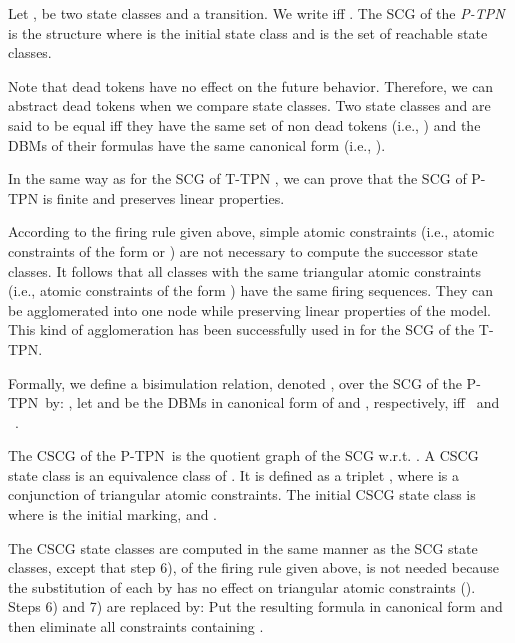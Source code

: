 \documentclass[submission,copyright,creativecommons]{eptcs}
\numberwithin{equation}{section}
\def\tppn{P-TPN}
\def\ttpn{T-TPN}
\begin{document}
\par Let ,  be two state classes and  a
transition. We write 
iff . The SCG of the
\emph{P-TPN} is the structure  where  is the initial state class and
 is the set of reachable state classes. \par Note that dead tokens have no effect on the future behavior. Therefore, we can abstract dead tokens when we compare state classes. Two state classes  and  are said to be equal iff they have the same set of non dead tokens (i.e., ) and the DBMs of their formulas have the same canonical form (i.e., ).
\par In the same way as for the SCG of T-TPN \cite{BVer03}, we can prove that the SCG of P-TPN is finite and  preserves linear properties.
\par According to the firing rule given above, simple atomic constraints (i.e., atomic constraints of the form  or ) are not necessary to compute the successor state classes. It follows that all classes with the same triangular atomic constraints (i.e., atomic constraints of the form ) have the same firing sequences. They can be agglomerated into one node while preserving linear
properties of the model. This kind of agglomeration has been successfully used in \cite{acsd07} for the SCG of the \ttpn.
\par Formally, we define a bisimulation relation, denoted , over the SCG of the \tppn~by: , let  and  be the DBMs in canonical form of  and , respectively,   iff  \ and \ .
\par The CSCG of the \tppn~is the quotient graph of the SCG w.r.t. . A CSCG state class is an equivalence class of . It is defined as a triplet , where  is a conjunction of triangular atomic constraints. The initial CSCG state class is  where  is the initial marking,  and .
\par The CSCG state classes are computed in the same manner as the SCG state classes, except that step 6), of the firing rule given above, is not needed because the substitution of each  by  has no effect on triangular atomic constraints (). Steps 6) and 7) are replaced by:
Put the resulting formula  in canonical form and then eliminate all constraints containing .
\end{document}
